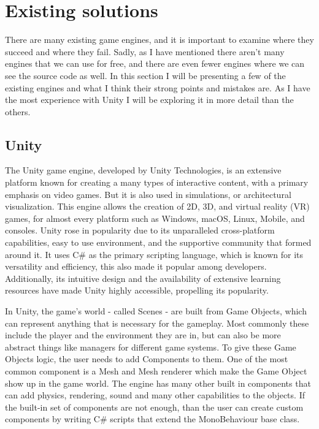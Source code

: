 \chapter{Existing solutions}

There are many existing game engines, and it is important to examine where they succeed and where they fail. Sadly, as I have mentioned there aren't many engines that we can use for free, and there are even fewer engines where we can see the source code as well. In this section I will be presenting a few of the existing engines and what I think their strong points and mistakes are.
As I have the most experience with Unity I will be exploring it in more detail than the others.

\section{Unity}

The Unity game engine\cite{unity}, developed by Unity Technologies, is an extensive platform known for creating a many types of interactive content, with a primary emphasis on video games. But it is also used in simulations, or architectural visualization. This engine allows the creation of 2D, 3D, and virtual reality (VR) games, for almost every platform such as Windows, macOS, Linux, Mobile, and consoles. Unity rose in popularity due to its unparalleled cross-platform capabilities, easy to use environment, and the supportive community that formed around it. It uses C\# as the primary scripting language, which is known for its versatility and efficiency, this also made it popular among developers. Additionally, its intuitive design and the availability of extensive learning resources have made Unity highly accessible, propelling its popularity.

In Unity, the game's world - called Scenes - are built from Game Objects, which can represent anything that is necessary for the gameplay. Most commonly these include the player and the environment they are in, but can also be more abstract things like managers for different game systems. To give these Game Objects logic, the user needs to add Components to them. One of the most common component is a Mesh and Mesh renderer which make the Game Object show up in the game world. The engine has many other built in components that can add physics, rendering, sound and many other capabilities to the objects. If the built-in set of components are not enough, than the user can create custom components by writing C\# scripts that extend the MonoBehaviour base class. 

